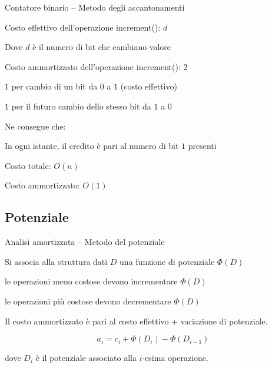 \begin{frame}{Contatore binario  -- Metodo degli accantonamenti}

\BI
\item Costo effettivo dell'operazione \textsf{increment}(): \alert{$d$} \\
\BI
  \item Dove $d$ è il numero di bit che cambiano valore
\EI
\item Costo ammortizzato dell'operazione \textsf{increment}(): \alert{$2$}
\BI 
  \item $1$ per cambio di un bit da $0$ a $1$ (costo effettivo)
  \item $1$ per il futuro cambio dello stesso bit da $1$ a $0$
\EI
\item  Ne consegue che: 
\BI
\item In ogni istante, il credito è pari al numero di bit $1$  presenti
\item Costo totale: $O(n)$
\item Costo ammortizzato: $O(1)$
\EI
\EI
\end{frame}

\subsection{Potenziale}

\begin{frame}{Analisi amortizzata -- Metodo del potenziale}

\begin{myboxtitle}
Si associa alla struttura dati $D$ una \alert{funzione di potenziale} $\Phi(D)$
\BI
\item le operazioni meno costose devono incrementare $\Phi(D)$
\item le operazioni più costose devono decrementare $\Phi(D)$
\EI
\end{myboxtitle}

\begin{myboxtitle}
Il \alert{costo ammortizzato} è pari al \alert{costo effettivo} + \alert{variazione di potenziale}.

\[
  a_i = c_i + \Phi(D_i) - \Phi(D_{i-1})
\]

dove $D_i$ è il potenziale associato alla $i$-esima operazione.
\end{myboxtitle}

\end{frame}


